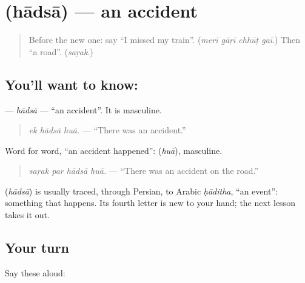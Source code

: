 \section[\texorpdfstring{\ur{حادثہ} (hādsā)}{حادثہ (hādsā)}]{ (hādsā) — an accident}

\label{lesson:UR-C271-hadsa}



\begin{quote}
Before the new one: say \textquotedblleft{}I missed my train\textquotedblright{}. (\emph{merī gāṛī chhūṭ gaī}.) Then \textquotedblleft{}a road\textquotedblright{}. (\emph{saṛak}.)
\end{quote}

\subsection*{You'll want to know: }
\textbf{} — \emph{hādsā} — \textquotedblleft{}an accident\textquotedblright{}. It is masculine.

\begin{quote}
\textbf{  }
\end{quote}

\begin{quote}
\emph{ek hādsā huā.} — \textquotedblleft{}There was an accident.\textquotedblright{}
\end{quote}

Word for word, \textquotedblleft{}an accident happened\textquotedblright{}: \textbf{} (\emph{huā}), masculine.

\begin{quote}
\textbf{   }
\end{quote}

\begin{quote}
\emph{saṛak par hādsā huā.} — \textquotedblleft{}There was an accident on the road.\textquotedblright{}
\end{quote}

\begin{cousinweb}
\textbf{} (\emph{hādsā}) is usually traced, through Persian, to Arabic \emph{ḥāditha}, \textquotedblleft{}an event\textquotedblright{}: something that happens. Its fourth letter is new to your hand; the next lesson takes it out.
\end{cousinweb}

\subsection*{Your turn}
Say these aloud:

